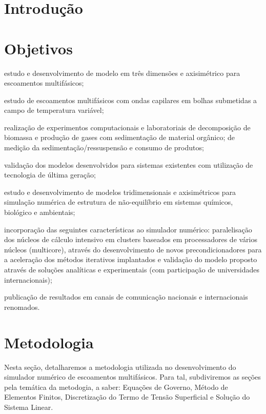 \documentclass[a4paper,portuges]{article}
\begin{document}
\section{Introdução}

\section{Objetivos}
\begin{documents}
	\item estudo e desenvolvimento de modelo em três dimensões e axisimétrico
	      para escoamentos multifásicos;
	\item estudo de escoamentos multifásicos com ondas capilares em bolhas
	      submetidas a campo de temperatura variável;
	\item realização de experimentos computacionais e laboratoriais de
		  decomposição de biomassa e produção de gases com sedimentação
		  de material orgânico; de medição da sedimentação/ressuspensão
		  e consumo de produtos;
	\item validação dos modelos desenvolvidos para sistemas existentes com
	      utilização de tecnologia de última geração;
	\item estudo e desenvolvimento de modelos tridimensionais e axisimétricos
		  para simulação numérica de estrutura de não-equilíbrio em
		  sistemas químicos, biológico e ambientais;
	\item incorporação das seguintes características ao simulador numérico:
		  paralelisação dos núcleos de cálculo intensivo em clusters
		  baseados em processadores de vários núcleos (multicore),
		  através do desenvolvimento de novos precondicionadores para a
		  aceleração dos métodos iterativos implantados e validação do
		  modelo proposto através de soluções analíticas e experimentais
		  (com participação de universidades internacionais);
	\item publicação de resultados em canais de comunicação nacionais e
	      internacionais renomados.
\end{documents}

\section{Metodologia}
Nesta seção, detalharemos a metodologia utilizada no desenvolvimento do
simulador numérico de escoamentos multifásicos. Para tal, subdiviremos
as seções pela temática da metodogia, a saber: Equações de Governo,
Método de Elementos Finitos, Discretização do Termo de Tensão
Superficial e Solução do Sistema Linear.
\end{document}
